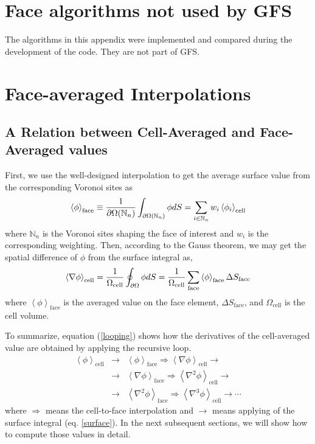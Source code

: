 \documentclass[twocolumn]{aastex63}
\begin{document}
\section{Face algorithms not used by GFS}
The algorithms in this appendix were implemented and compared during the development of the code. They are not part of GFS.

\section{Face-averaged Interpolations}
\subsection{A Relation between Cell-Averaged and Face-Averaged values}
First, we use the well-designed interpolation to get the average surface value from the corresponding Voronoi sites as
\begin{equation}
	\left< \phi\right>_\textrm{face}\equiv {1\over \partial \Omega(\mathbb{N}_n)}\int_{\partial \Omega(\mathbb{N}_n)} \phi dS   = \sum_{i\in \mathbb{N}_n} w_i\left<\phi_i\right>_\textrm{cell}
\end{equation}
where $\mathbb{N}_n$ is the  Voronoi sites shaping the face of interest and $w_i$ is the corresponding weighting.
Then, according to the Gauss theorem, we may get the spatial difference of $\phi$ from the surface integral as,
\begin{equation} \label{surface}
	\left<\nabla\phi\right>_\textrm{cell} = {1\over \Omega_\textrm{cell}} \oint_{\partial \Omega} \phi dS  = {1\over \Omega_\textrm{cell}}\sum_\textrm{face} \left<\phi\right>_\textrm{face} \Delta S_\textrm{face}
\end{equation}
where $\left<\phi\right>_\textrm{face}$ is the averaged value on the face element, $\Delta S_\textrm{face}$, and $\Omega_\textrm{cell}$ is the cell volume.

To summarize, equation (\ref{looping}) shows how the derivatives of the cell-averaged value are obtained by applying the recursive loop. \begin{eqnarray} \nonumber \label{looping}
	\left<\phi\right>_\textrm{cell} &\rightarrow &\left<\phi\right>_\textrm{face} \Rightarrow \left<\nabla\phi\right>_\textrm{cell} \rightarrow \\ \nonumber &\rightarrow& \left<\nabla\phi\right>_\textrm{face} \Rightarrow \left<\nabla^2\phi\right>_\textrm{cell} \rightarrow \\ 
	&\rightarrow& \left<\nabla^2\phi\right>_\textrm{face} \Rightarrow \left<\nabla^3\phi\right>_\textrm{cell} \rightarrow \cdots
\end{eqnarray}
where $\Rightarrow$ means the cell-to-face interpolation and $\rightarrow$ means applying of the surface integral (eq. \ref{surface}). In the next subsequent sections, we will show how to compute those values in detail.
\end{document}
